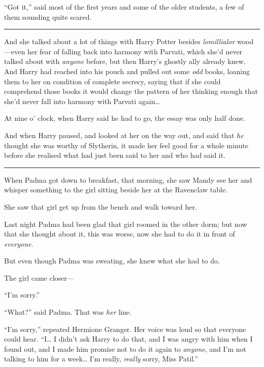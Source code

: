 ``Got it,'' said most of the first years and some of the older students,
a few of them sounding quite scared.

\begin{center}\rule{3in}{0.4pt}\end{center}

And she talked about a lot of things with Harry Potter besides
\emph{lomillialor} wood---even her fear of falling back into harmony
with Parvati, which she'd never talked about with \emph{anyone} before,
but then Harry's ghostly ally already knew. And Harry had reached into
his pouch and pulled out some \emph{odd} books, loaning them to her on
condition of complete secrecy, saying that if she could comprehend those
books it would change the pattern of her thinking enough that she'd
never fall into harmony with Parvati again\ldots{}

At nine o' clock, when Harry said he had to go, the essay was only half
done.

And when Harry paused, and looked at her on the way out, and said that
\emph{he} thought she was worthy of Slytherin, it made her feel good for
a whole minute before she realised what had just been said to her and
who had said it.

\begin{center}\rule{3in}{0.4pt}\end{center}

When Padma got down to breakfast, that morning, she saw Mandy see her
and whisper something to the girl sitting beside her at the Ravenclaw
table.

She saw that girl get up from the bench and walk toward her.

Last night Padma had been glad that girl roomed in the other dorm; but
now that she thought about it, this was worse, now she had to do it in
front of \emph{everyone}.

But even though Padma was sweating, she knew what she had to do.

The girl came closer---

``I'm sorry.''

``What?'' said Padma. That was \emph{her} line.

``I'm sorry,'' repeated Hermione Granger. Her voice was loud so that
everyone could hear. ``I\ldots{} I didn't ask Harry to do that, and I
was angry with him when I found out, and I made him promise not to do it
again to \emph{anyone}, and I'm not talking to him for a week\ldots{}
I'm really, \emph{really} sorry, Miss Patil.''

